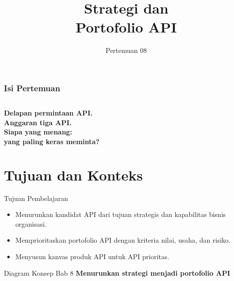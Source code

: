 \documentclass[aspectratio=169, table, 12pt]{beamer}
\title{\Huge Strategi dan\\ \vspace{10pt} Portofolio API}
\date{Pertemuan 08}
\begin{document}
\frame{\titlepage}

\begin{frame}
  \frametitle{Isi Pertemuan}
  \vspace{14pt}
  \begin{columns}[t]
    {\small\tableofcontents[sections={1-4}]}

    {\small\tableofcontents[sections={5-8}]}
  \end{columns}
\end{frame}

\begin{frame}{\hfill}
  \centering
  \Huge{\textbf{Delapan permintaan API.\\Anggaran tiga API.\\Siapa yang menang:\\yang paling keras meminta?}}
\end{frame}

\section{Tujuan dan Konteks}

\begin{frame}{{\Large Tujuan Pembelajaran}}
  \vspace{10pt}
  \begin{itemize}
    \item Menurunkan kandidat API dari tujuan strategis dan kapabilitas bisnis organisasi.
    \item Memprioritaskan portofolio API dengan kriteria nilai, usaha, dan risiko.
    \item Menyusun kanvas produk API untuk API prioritas.
  \end{itemize}
\end{frame}

\begin{frame}{{\Large Diagram Konsep Bab 8}}
  \centering
  {\small\bfseries Menurunkan strategi menjadi portofolio API}\par\medskip
\end{frame}
\end{document}

